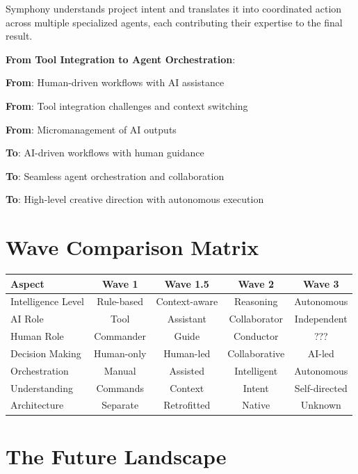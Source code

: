 Symphony understands project intent and translates it into coordinated action across multiple specialized agents, each contributing their expertise to the final result.

\textbf{From Tool Integration to Agent Orchestration}:
\begin{compactlist}
    \item \textbf{From}: Human-driven workflows with AI assistance
    \item \textbf{From}: Tool integration challenges and context switching
    \item \textbf{From}: Micromanagement of AI outputs
    \item \textbf{To}: AI-driven workflows with human guidance
    \item \textbf{To}: Seamless agent orchestration and collaboration
    \item \textbf{To}: High-level creative direction with autonomous execution
\end{compactlist}

\section{Wave Comparison Matrix}
\label{sec:wave-comparison-matrix}

\begin{center}
\begin{tabular}{@{}lcccc@{}}
\toprule
\textbf{Aspect} & \textbf{Wave 1} & \textbf{Wave 1.5} & \textbf{Wave 2} & \textbf{Wave 3} \\
\midrule
Intelligence Level & Rule-based & Context-aware & Reasoning & Autonomous \\
AI Role & Tool & Assistant & Collaborator & Independent \\
Human Role & Commander & Guide & Conductor & ??? \\
Decision Making & Human-only & Human-led & Collaborative & AI-led \\
Orchestration & Manual & Assisted & Intelligent & Autonomous \\
Understanding & Commands & Context & Intent & Self-directed \\
Architecture & Separate & Retrofitted & Native & Unknown \\
\bottomrule
\end{tabular}
\label{tab:-wave-matrix}
\end{center}

\section{The Future Landscape}
\label{sec:future-landscape}


